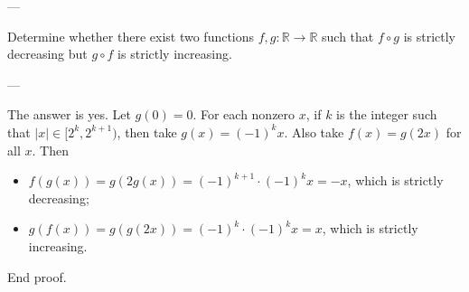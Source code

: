 
---

Determine whether there exist two functions $f,g:\mathbb R\to\mathbb R$ such that $f\circ g$ is strictly decreasing but $g\circ f$ is strictly increasing.

---

The answer is yes. Let $g(0)=0$. For each nonzero $x$, if $k$ is the integer such that $|x|\in[2^k,2^{k+1})$, then take $g(x)=(-1)^kx$. Also take $f(x)=g(2x)$ for all $x$. Then
\begin{itemize}[itemsep=0em]
    \item $f(g(x))=g(2g(x))=(-1)^{k+1}\cdot(-1)^kx=-x$, which is strictly decreasing;
    \item $g(f(x))=g(g(2x))=(-1)^k\cdot(-1)^kx=x$, which is strictly increasing.
\end{itemize}
End proof.

